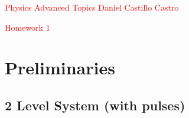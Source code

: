 \documentclass{article}
\begin{document}
\large 
{\Large  \textcolor{Red}{Physics Advanced Topics} }
\hfill \Large   \textcolor{Red}{Daniel Castillo Castro}
\begin{center}
\Large  \textcolor{Red}{Homework 1}
\end{center}
\vspace{0.05in}
\chapterfont{\color{Red}}
\sectionfont{\color{Red}}
\subsectionfont{\color{Red}}
\everymath{\color{blue}}
\everydisplay{\color{blue}}
\tableofcontents

\section{Preliminaries}
\subsection{2 Level System (with pulses)}
\end{document}
